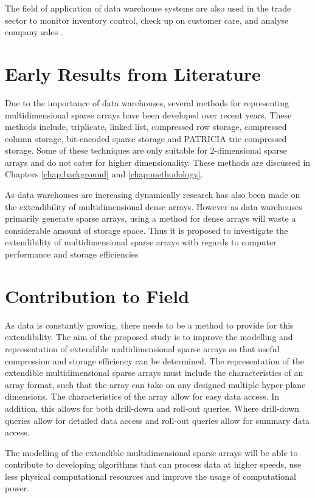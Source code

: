 The field of application of data warehouse systems are also used in the trade sector to monitor inventory control, check up on customer care, and analyse company sales \cite{golfarelli:2009:dwd}.

\section{Early Results from Literature}
Due to the importance of data warehouses, several methods for representing multidimensional sparse arrays have been developed over recent years. These methods include, triplicate, linked list, compressed row storage, compressed column storage, bit-encoded sparse storage and PATRICIA trie compressed storage. Some of these techniques are only suitable for 2-dimensional sparse arrays and do not cater for higher dimensionality. These methods are discussed in Chapters \ref{chap:background} and \ref{chap:methodology}. 

As data warehouses are increasing dynamically research has also been made on the extendibility of multidimensional dense arrays. However as data warehouses primarily generate sparse arrays, using a method for dense arrays will waste a considerable amount of storage space. Thus it is proposed to investigate the extendibility of multidimensional sparse arrays with regards to computer performance and storage efficiencies

\section{Contribution to Field}
As data is constantly growing, there needs to be a method to provide for this extendibility. The aim of the proposed study is to improve the modelling and representation of extendible multidimensional sparse arrays so that useful compression and storage efficiency can be determined. The representation of the extendible multidimensional sparse arrays must include the characteristics of an array format, such that the array can take on any designed multiple hyper-plane dimensions. The characteristics of the array allow for easy data access. In addition, this allows for both drill-down and roll-out queries. Where drill-down queries allow for detailed data access and roll-out queries allow for summary data access.

The modelling of the extendible multidimensional sparse arrays will be able to contribute to developing algorithms that can process data at higher speeds, use less physical computational resources and improve the usage of computational power.

